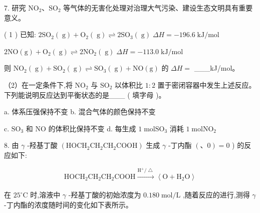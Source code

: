 \documentclass[10pt]{article}
\begin{document}
7. 研究 \({\mathrm{{NO}}}_{2}\text{、}{\mathrm{{SO}}}_{2}\) 等气体的无害化处理对治理大气污染、建设生态文明具有重要意义。

( 1 ) 已知: \(2{\mathrm{{SO}}}_{2}\left( \mathrm{\;g}\right) + {\mathrm{O}}_{2}\left( \mathrm{\;g}\right) \rightleftharpoons 2{\mathrm{{SO}}}_{3}\left( \mathrm{\;g}\right) \;{\Delta H} = - {196.6}\mathrm{\;{kJ}}/\mathrm{{mol}}\)

\(2\mathrm{{NO}}\left( \mathrm{g}\right) + {\mathrm{O}}_{2}\left( \mathrm{\;g}\right) \rightleftharpoons 2{\mathrm{{NO}}}_{2}\left( \mathrm{\;g}\right) \;{\Delta H} = - {113.0}\mathrm{\;{kJ}}/\mathrm{{mol}}\)

则 \({\mathrm{{NO}}}_{2}\left( \mathrm{\;g}\right) + {\mathrm{{SO}}}_{2}\left( \mathrm{\;g}\right) \rightleftharpoons {\mathrm{{SO}}}_{3}\left( \mathrm{\;g}\right) + \mathrm{{NO}}\left( \mathrm{g}\right)\) 的 \({\Delta H} =\) \_\_\_kJ/mol。

（2）在一定条件下,将 \({\mathrm{{NO}}}_{2}\) 与 \({\mathrm{{SO}}}_{2}\) 以体积比 \(1 : 2\) 置于密闭容器中发生上述反应。下列能说明反应达到平衡状态的是\_\_\_ ( 填字母 )。

a. 体系压强保持不变 b. 混合气体的颜色保持不变

c. \({\mathrm{{SO}}}_{3}\) 和 \(\mathrm{{NO}}\) 的体积比保持不变 d. 每生成 \(1\mathrm{\;{mol}}{\mathrm{{SO}}}_{3}\) 消耗 \(1\mathrm{\;{mol}}{\mathrm{{NO}}}_{2}\)

8. 由 \(\gamma\) -羟基丁酸 \(\left( {{\mathrm{{HOCH}}}_{2}{\mathrm{{CH}}}_{2}{\mathrm{{CH}}}_{2}\mathrm{{COOH}}}\right)\) 生成 \(\gamma\) -丁内酯 \(\left( {\text{、}0}\right) = 0\) ) 的反应如下:

\[
{\mathrm{{HOCH}}}_{2}{\mathrm{{CH}}}_{2}{\mathrm{{CH}}}_{2}\mathrm{{COOH}}\xrightarrow[]{{\mathrm{H}}^{ + }/\bigtriangleup }\left\langle {\mathrm{O} + {\mathrm{H}}_{2}\mathrm{O}}\right\rangle
\]

在 \({25}^{ \circ }\mathrm{C}\) 时,溶液中 \(\gamma\) -羟基丁酸的初始浓度为 \({0.180}\mathrm{\;{mol}}/\mathrm{L}\) ,随着反应的进行,测得 \(\gamma\) -丁内酯的浓度随时间的变化如下表所示。

\begin{center}
\end{center}
\end{document}
